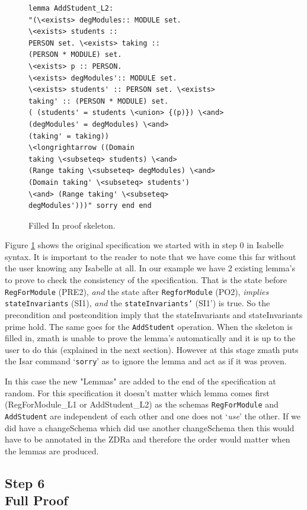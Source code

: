\begin{figure}[H]
\begin{minipage}{0.45\textwidth}
\begin{scriptsize}
\begin{BVerbatim}
lemma AddStudent_L2: 
"(\<exists> degModules:: MODULE set. 
\<exists> students ::
PERSON set. \<exists> taking :: 
(PERSON * MODULE) set. 
\<exists> p :: PERSON.
\<exists> degModules':: MODULE set. 
\<exists> students' :: PERSON set. \<exists>
taking' :: (PERSON * MODULE) set. 
( (students' = students \<union> {(p)}) \<and>
(degModules' = degModules) \<and> 
(taking' = taking)) 
\<longrightarrow ((Domain
taking \<subseteq> students) \<and> 
(Range taking \<subseteq> degModules) \<and>
(Domain taking' \<subseteq> students') 
\<and> (Range taking' \<subseteq>
degModules')))" sorry end end
\end{BVerbatim}
\end{scriptsize}
\end{minipage}
\caption{Filled In proof skeleton. \label{fig:fillinFullexample}}
\end{figure}

Figure \ref{fig:fillinFullexample} shows the original specification we started
with in step 0 in Isabelle syntax. It is important to the reader to note that we
have come this far without the user knowing any Isabelle at all. In our example
we have 2 existing lemma's to prove to check the consistency of the
specification. That is the state before \texttt{RegForModule} (PRE2), \emph{and}
the state after \texttt{RegforModule} (PO2), \emph{implies}
\texttt{stateInvariants} (SI1), \emph{and} the \texttt{stateInvariants'} (SI1')
is true. So the precondition and postcondition imply that the stateInvariants
and stateInvariants prime hold. The same goes for the \texttt{AddStudent}
operation. When the skeleton is filled in, \gls{zmath} is unable to prove the
lemma's automatically and it is up to the user to do this (explained in the next
section). However at this stage \gls{zmath} puts the Isar command
`\texttt{sorry}' as to ignore the lemma and act as if it was proven.

In this case the new "Lemmas" are added to the end of the specification at random.
For this specification it doesn't matter which lemma comes first (RegForModule\_L1 or AddStudent\_L2)
as the schemas \texttt{RegForModule} and \texttt{AddStudent} are independent of
each other
and one does not `\textit{use}' the other. If we did have a changeSchema which did use another changeSchema
then this would have to be annotated in the ZDRa and therefore the order would matter when the lemmas are produced.


\subsection{Step 6\\Full Proof}

